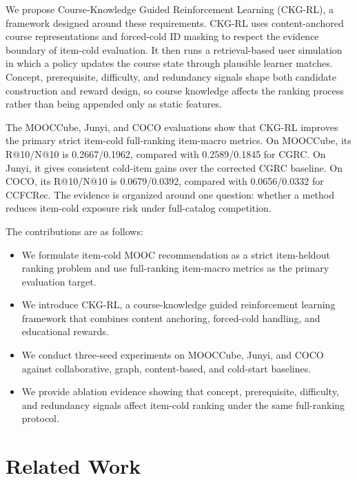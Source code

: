 \documentclass[sigconf,anonymous,review]{acmart}
\begin{document}
We propose Course-Knowledge Guided Reinforcement Learning (CKG-RL), a framework designed around these requirements. CKG-RL uses content-anchored course representations and forced-cold ID masking to respect the evidence boundary of item-cold evaluation. It then runs a retrieval-based user simulation in which a policy updates the course state through plausible learner matches. Concept, prerequisite, difficulty, and redundancy signals shape both candidate construction and reward design, so course knowledge affects the ranking process rather than being appended only as static features.

The MOOCCube, Junyi, and COCO evaluations show that CKG-RL improves the primary strict item-cold full-ranking item-macro metrics. On MOOCCube, its R@10/N@10 is 0.2667/0.1962, compared with 0.2589/0.1845 for CGRC. On Junyi, it gives consistent cold-item gains over the corrected CGRC baseline. On COCO, its R@10/N@10 is 0.0679/0.0392, compared with 0.0656/0.0332 for CCFCRec. The evidence is organized around one question: whether a method reduces item-cold exposure risk under full-catalog competition.

The contributions are as follows:
\begin{itemize}
    \item We formulate item-cold MOOC recommendation as a strict item-heldout ranking problem and use full-ranking item-macro metrics as the primary evaluation target.
    \item We introduce CKG-RL, a course-knowledge guided reinforcement learning framework that combines content anchoring, forced-cold handling, and educational rewards.
    \item We conduct three-seed experiments on MOOCCube, Junyi, and COCO against collaborative, graph, content-based, and cold-start baselines.
    \item We provide ablation evidence showing that concept, prerequisite, difficulty, and redundancy signals affect item-cold ranking under the same full-ranking protocol.
\end{itemize}

\section{Related Work}
\end{document}
